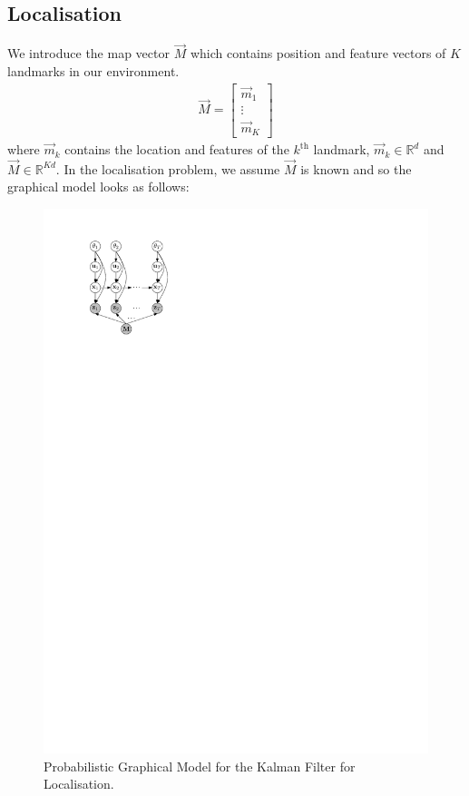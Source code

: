 \subsection{Localisation}
\label{subsec:models/kf/localisation}
We introduce the map vector $\vec M$ which contains position and feature vectors of $K$ landmarks in our environment.
\begin{align}
	\vec M = 
		\begin{bmatrix}
			\vec m_1 \\
			\vdots \\
			\vec m_K
		\end{bmatrix}
\end{align}
where $\vec m_k$ contains the location and features of the $k^{\text{th}}$ landmark, $\vec m_k \in \mathbb R^d$ and $\vec M \in \mathbb R^{Kd}$. In the localisation problem, we assume $\vec M$ is known and so the graphical model looks as follows:
\begin{figure}[!htb]
\centering
\includegraphics[scale=1]{models/kf/figures/kf-loc}
\caption{Probabilistic Graphical Model for the Kalman Filter for Localisation.}
\label{fig:models/kf/figures/kf-loc}
\end{figure}

